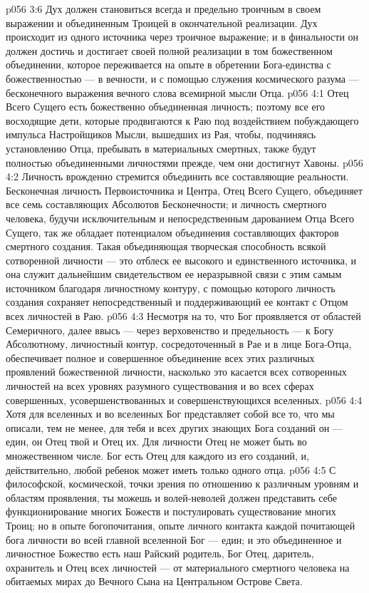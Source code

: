 \vs p056 3:6 Дух должен становиться всегда и предельно троичным в своем выражении и объединенным Троицей в окончательной реализации. Дух происходит из одного источника через троичное выражение; и в финальности он должен достичь и достигает своей полной реализации в том божественном объединении, которое переживается на опыте в обретении Бога\hyp{}единства с божественностью --- в вечности, и с помощью служения космического разума --- бесконечного выражения вечного слова всемирной мысли Отца.
\vs p056 4:1 Отец Всего Сущего есть божественно объединенная личность; поэтому все его восходящие дети, которые продвигаются к Раю под воздействием побуждающего импульса Настройщиков Мысли, вышедших из Рая, чтобы, подчиняясь установлению Отца, пребывать в материальных смертных, также будут полностью объединенными личностями прежде, чем они достигнут Хавоны.
\vs p056 4:2 Личность врожденно стремится объединить все составляющие реальности. Бесконечная личность Первоисточника и Центра, Отец Всего Сущего, объединяет все семь составляющих Абсолютов Бесконечности; и личность смертного человека, будучи исключительным и непосредственным дарованием Отца Всего Сущего, так же обладает потенциалом объединения составляющих факторов смертного создания. Такая объединяющая творческая способность всякой сотворенной личности --- это отблеск ее высокого и единственного источника, и она служит дальнейшим свидетельством ее неразрывной связи с этим самым источником благодаря личностному контуру, с помощью которого личность создания сохраняет непосредственный и поддерживающий ее контакт с Отцом всех личностей в Раю.
\vs p056 4:3 Несмотря на то, что Бог проявляется от областей Семеричного, далее ввысь --- через верховенство и предельность --- к Богу Абсолютному, личностный контур, сосредоточенный в Рае и в лице Бога\hyp{}Отца, обеспечивает полное и совершенное объединение всех этих различных проявлений божественной личности, насколько это касается всех сотворенных личностей на всех уровнях разумного существования и во всех сферах совершенных, усовершенствованных и совершенствующихся вселенных.
\vs p056 4:4 \pc Хотя для вселенных и во вселенных Бог представляет собой все то, что мы описали, тем не менее, для тебя и всех других знающих Бога созданий он --- един, он Отец твой и Отец их. Для личности Отец не может быть во множественном числе. Бог есть Отец для каждого из его созданий, и, действительно, любой ребенок может иметь только одного отца.
\vs p056 4:5 С философской, космической, точки зрения по отношению к различным уровням и областям проявления, ты можешь и волей\hyp{}неволей должен представить себе функционирование многих Божеств и постулировать существование многих Троиц; но в опыте богопочитания, опыте личного контакта каждой почитающей бога личности во всей главной вселенной Бог --- един; и это объединенное и личностное Божество есть наш Райский родитель, Бог Отец, даритель, охранитель и Отец всех личностей --- от материального смертного человека на обитаемых мирах до Вечного Сына на Центральном Острове Света.
